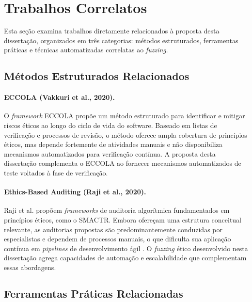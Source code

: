 \section{Trabalhos Correlatos}
\label{sec:correlatos}

Esta seção examina trabalhos diretamente relacionados à proposta desta dissertação, organizados em três categorias: métodos estruturados, ferramentas práticas e técnicas automatizadas correlatas ao \textit{fuzzing}.

\subsection{Métodos Estruturados Relacionados}
\label{sec:metodos-correlatos}

\paragraph{\textbf{ECCOLA (Vakkuri et al., 2020).}}

O \textit{framework} ECCOLA \cite{S013, S012} propõe um método estruturado para identificar e mitigar riscos éticos ao longo do ciclo de vida do software. Baseado em listas de verificação e processos de revisão, o método oferece ampla cobertura de princípios éticos, mas depende fortemente de atividades manuais e não disponibiliza mecanismos automatizados para verificação contínua. A proposta desta dissertação complementa o ECCOLA ao fornecer mecanismos automatizados de teste voltados à fase de verificação.

\paragraph{\textbf{Ethics-Based Auditing (Raji et al., 2020).}}

Raji et al. \cite{Raji2020} propõem \textit{frameworks} de auditoria algorítmica fundamentados em princípios éticos, como o SMACTR. Embora ofereçam uma estrutura conceitual relevante, as auditorias propostas são predominantemente conduzidas por especialistas e dependem de processos manuais, o que dificulta sua aplicação contínua em \textit{pipelines} de desenvolvimento ágil \cite{S046}. O \textit{fuzzing} ético desenvolvido nesta dissertação agrega capacidades de automação e escalabilidade que complementam essas abordagens.

\subsection{Ferramentas Práticas Relacionadas}
\label{sec:ferramentas-correlatas}


